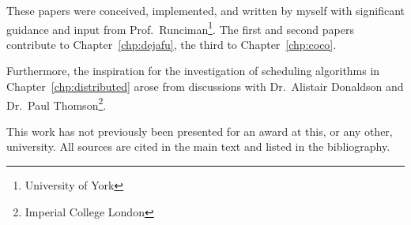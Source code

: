 These papers were conceived, implemented, and written by myself with significant guidance and input
from Prof.~Runciman\footnote{University of York}.  The first and second papers contribute to
Chapter~\ref{chp:dejafu}, the third to Chapter~\ref{chp:coco}.

Furthermore, the inspiration for the investigation of scheduling algorithms in
Chapter~\ref{chp:distributed} arose from discussions with Dr.~Alistair Donaldson and Dr.~Paul
Thomson\footnote{Imperial College London}.

This work has not previously been presented for an award at this, or any other, university.  All
sources are cited in the main text and listed in the bibliography.
